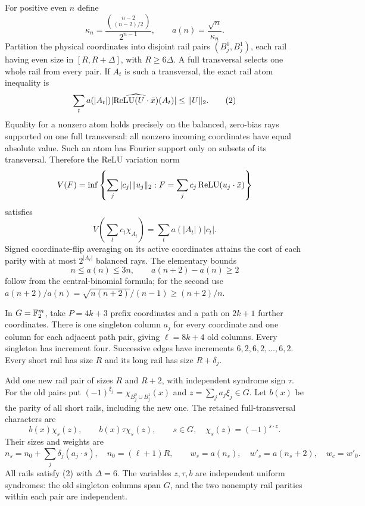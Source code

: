 \documentclass[11pt]{article}
\begin{document}
For positive even $n$ define
\[
 \kappa_n=\frac{\binom{n-2}{(n-2)/2}}{2^{n-1}},\qquad
 a(n)=\frac{\sqrt n}{\kappa_n}.
\]
Partition the physical coordinates into disjoint rail pairs
$(B_j^0,B_j^1)$, each rail having even size in $[R,R+\Delta]$, with
$R\ge6\Delta$. A full transversal selects one whole rail from every
pair. If $A_t$ is such a transversal, the exact rail atom inequality is
\[
 \sum_t a(|A_t|)|\widehat{\operatorname{ReLU}(U\cdot\bar x)}(A_t)|
                                                    \le\|U\|_2. \tag{2}
\]
Equality for a nonzero atom holds precisely on the balanced,
zero-bias rays supported on one full transversal: all nonzero incoming
coordinates have equal absolute value. Such an atom has Fourier support
only on subsets of its transversal. Therefore the ReLU variation norm
\[
 V(F)=\inf\left\{\sum_j|c_j|\|u_j\|_2:
                    F=\sum_jc_j\operatorname{ReLU}(u_j\cdot\bar x)\right\}
\]
satisfies
\[
 V\left(\sum_t c_t\chi_{A_t}\right)
                          =\sum_t a(|A_t|)|c_t|.          \tag{3}
\]
Signed coordinate-flip averaging on its active coordinates attains
the cost of each parity with at most $2^{|A_t|}$ balanced rays.
The elementary bounds
\[
 n\le a(n)\le3n,\qquad a(n+2)-a(n)\ge2                  \tag{4}
\]
follow from the central-binomial formula; for the second use
$a(n+2)/a(n)=\sqrt{n(n+2)}/(n-1)\ge(n+2)/n$.

In $G=\mathbb F_2^m$, take $P=4k+3$ prefix coordinates and a path on
$2k+1$ further coordinates. There is one singleton column $a_j$ for
every coordinate and one column for each adjacent path pair, giving
$\ell=8k+4$ old columns. Every singleton has increment four.
Successive edges have increments $6,2,6,2,\ldots,6,2$.
Every short rail has size $R$ and its long rail has size $R+\delta_j$.

Add one new rail pair of sizes $R$ and $R+2$, with independent syndrome
sign $\tau$. For the old pairs put
$(-1)^{\xi_j}=\chi_{B_j^0\cup B_j^1}(x)$ and
$z=\sum_j a_j\xi_j\in G$. Let $b(x)$ be the parity of all short rails,
including the new one. The retained full-transversal characters are
\[
 b(x)\chi_s(z),\qquad b(x)\tau\chi_s(z),\qquad s\in G,
 \quad \chi_s(z)=(-1)^{s\cdot z}.
\]
Their sizes and weights are
\[
 n_s=n_0+\sum_j\delta_j(a_j\cdot s),\quad n_0=(\ell+1)R,
 \qquad w_s=a(n_s),\quad w'_s=a(n_s+2),\quad w_c=w'_0.     \tag{5}
\]
All rails satisfy (2) with $\Delta=6$. The variables $z,\tau,b$ are
independent uniform syndromes: the old singleton columns span $G$,
and the two nonempty rail parities within each pair are independent.
\end{document}
